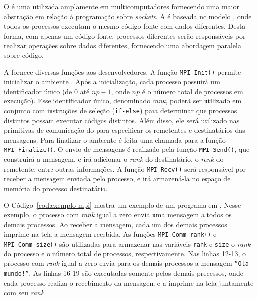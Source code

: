 O \mpi é uma \api utilizada amplamente em multicomputadores fornecendo uma maior
abstração em relação à programação sobre \textit{sockets}. A \api é baseada no
modelo \spmd, onde todos os processos executam o mesmo código fonte com
dados diferentes. Desta forma, com apenas um código fonte, processos diferentes
serão responsáveis por realizar operações sobre dados diferentes, fornecendo uma abordagem
paralela sobre código.

A \api fornece diversas funções aos desenvolvedores. A função \texttt{MPI\_Init()} permite inicializar o ambiente \mpi.
Após a inicialização, cada processo \mpi possuirá um identificador único (de $0$ até $np-1$, onde $np$ é o número total
de processos \mpi em execução). Esse identificador único, denominado \textit{rank}, poderá ser utilizado em conjunto com
instruções de seleção (\texttt{if-else}) para determinar que processos \mpi
distintos possam executar códigos distintos. Além disso,
ele será utilizado nas primitivas de comunicação do \mpi para especificar os remetentes e destinatários das mensagens.
Para finalizar o ambiente \mpi é feita uma chamada para a função \texttt{MPI\_Finalize()}. O envio de mensagens
é realizado pela função \texttt{MPI\_Send()}, que construirá a mensagem, e irá
adicionar o \textit{rank} do destinatário, o \textit{rank} do remetente, entre
outras informações. A função \texttt{MPI\_Recv()} será responsável por receber a
mensagem enviada pelo processo, e irá armazená-la no espaço de memória
do processo destinatário.

O Código~\ref{cod:exemplo-mpi} mostra um exemplo de um programa em \mpi. Nesse
exemplo, o processo com \textit{rank} igual a zero
envia uma mensagem a todos os demais processos. Ao receber a mensagem, cada um dos demais processos imprime na tela a mensagem
recebida. As funções \texttt{MPI\_Comm\_rank()} e \texttt{MPI\_Comm\_size()} são utilizadas para armazenar nas variáveis \texttt{rank} e \texttt{size}
o \textit{rank} do processo e o número total de processos, respectivamente. Nas
linhas 12-13, o processo com \textit{rank} igual a zero envia para os
demais processos a mensagem \texttt{``Ola mundo!''}. As linhas 16-19 são executadas somente pelos demais processos, onde cada processo
realiza o recebimento da mensagem e a imprime na tela juntamente com seu \textit{rank}.

